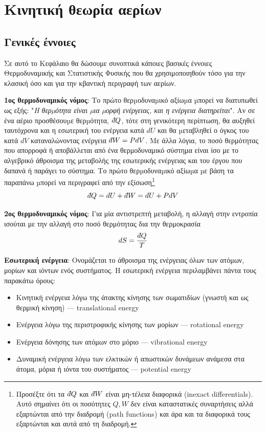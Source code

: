 \chapter{Κινητική θεωρία αερίων}
\label{apx:kinetic_theory}

\section{Γενικές έννοιες}
\label{apx:sec:general}
Σε αυτό το Κεφάλαιο θα δώσουμε συνοπτικά κάποιες βασικές έννοιες Θερμοδυναμικής και Στατιστικής Φυσικής που θα χρησιμοποιηθούν τόσο για την κλασική όσο και για την κβαντική περιγραφή των αερίων.

\textbf{1ος θερμοδυναμικός νόμος}: Το πρώτο θερµοδυναµικό αξίωµα µπορεί να διατυπωθεί ως εξής: "\textit{Η θερµότητα
είναι µια µορφή ενέργειας, και η ενέργεια διατηρείται}". Αν σε ένα αέριο προσθέσουµε θερµότητα, $\dbar Q$, τότε στη γενικότερη περίπτωση, θα αυξηθεί ταυτόχρονα και η εσωτερική του ενέργεια κατά $dU$ και θα µεταβληθεί ο όγκος του κατά $dV$ καταναλώνοντας ενέργεια $\dbar W = P dV$. Με άλλα λόγια, το ποσό θερμότητας που απορροφά ή αποβάλλεται από ένα θερμοδυναμικό σύστημα είναι ίσο με το αλγεβρικό άθροισμα της μεταβολής της εσωτερικής ενέργειας και του έργου που δαπανά ή παράγει το σύστημα.
Το πρώτο θερµοδυναµικό αξίωµα µε βάση τα παραπάνω µπορεί να περιγραφεί από την εξίσωση\footnote{Προσέξτε ότι τα $\dbar Q$ και $\dbar W$ είναι μη-τέλεια διαφορικά (inexact differentials). Αυτό σημαίνει ότι οι ποσότητες $Q,W$ δεν είναι καταστατικές συναρτήσεις αλλά εξαρτώνται από την διαδρομή (path functions) και άρα και τα διαφορικά τους εξαρτώνται και αυτά από τη διαδρομή.}
\begin{equation}
    \dbar Q = dU + \dbar W = dU + P dV
\end{equation}

\textbf{2ος θερμοδυναμικός νόμος}: Για μία αντιστρεπτή μεταβολή, η αλλαγή στην εντροπία ισούται με την αλλαγή στο ποσό θερμότητας δια την θερμοκρασία
\begin{equation}
    dS = \frac{\dbar Q}{T}
\end{equation}


\textbf{Εσωτερική ενέργεια}: Ονομάζεται το άθροισμα της ενέργειας όλων των ατόμων, μορίων και ιόντων ενός συστήματος. Η εσωτερική ενέργεια περιλαμβάνει πάντα τους παρακάτω όρους:
\begin{itemize}
    \item Κινητική ενέργεια λόγω της άτακτης κίνησης των σωματιδίων (γνωστή και ως θερμική κίνηση) --- translational energy
    \item Ενέργεια λόγω της περιστροφικής κίνησης των μορίων --- rotational energy
    \item Ενέργεια δόνησης των ατόμων στο μόριο --- vibrational energy
    \item Δυναμική ενέργεια λόγω των ελκτικών ή απωστικών δυνάμεων ανάμεσα στα άτομα, μόρια ή ιόντα του συστήματος --- potential energy
\end{itemize}

